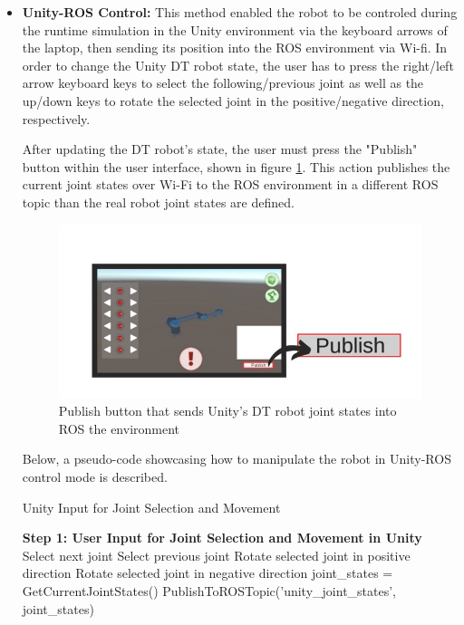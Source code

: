 \begin{itemize}
   
    \item \textbf{Unity-ROS Control:} This method enabled the robot to be controled during the runtime simulation in the Unity environment via the keyboard arrows of the laptop, then sending its position into the ROS environment via Wi-fi. 
    In order to change the Unity \ac{DT} robot state, the user has to press the right/left arrow keyboard keys to select the following/previous joint as well as the up/down keys to rotate the selected joint in the positive/negative direction, respectively.
    
    After updating the \ac{DT} robot's state, the user must press the "Publish" button within the user interface, shown in figure \ref{fig:publish_UI_button}. This action publishes the current joint states over Wi-Fi to the ROS environment in a different \ac{ROS} topic than the real robot joint states are defined. 

    \begin{figure}[htpb]
        \centering
        \includegraphics[width=0.9\linewidth]{figs/publish.jpeg}
        \caption{Publish button that sends Unity's \ac{DT} robot joint states into ROS the environment}
        \label{fig:publish_UI_button}
    \end{figure}
    
    Below, a pseudo-code showcasing how to manipulate the robot in Unity-ROS control mode is described.
    \begin{algorithm}
        \caption{Unity Input for Joint Selection and Movement}\label{alg:unity_input}
        \begin{algorithmic}[1]
            \State \textbf{Step 1: User Input for Joint Selection and Movement in Unity}
                    \State Select next joint
                    \State Select previous joint
                \EndIf
                    \State Rotate selected joint in positive direction
                    \State Rotate selected joint in negative direction
                \EndIf
                    \State joint\_states = GetCurrentJointStates()
                    \State PublishToROSTopic('unity\_joint\_states', joint\_states)
                \EndIf
            \EndWhile
        \end{algorithmic}
    \end{algorithm}


\end{itemize}
